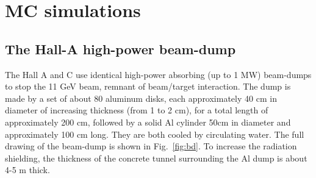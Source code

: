 \section{MC simulations}
\label{sec:sim}
\subsection{The Hall-A high-power beam-dump}
The Hall A and C use identical high-power absorbing (up to 1 MW)  beam-dumps to stop the 11 GeV beam, remnant of beam/target interaction. The dump is made by a set of about 80 aluminum disks, each
approximately 40 cm in diameter of increasing thickness (from 1 to 2 cm), for a total
length of approximately 200 cm, followed by a solid Al cylinder 50cm in diameter
and approximately 100 cm long. They are both cooled by circulating water. The full
drawing of the beam-dump is shown in Fig.~\ref{fig:bd}. To increase the radiation shielding,
the thickness of the concrete tunnel surrounding the Al dump is about 4-5 m thick.

